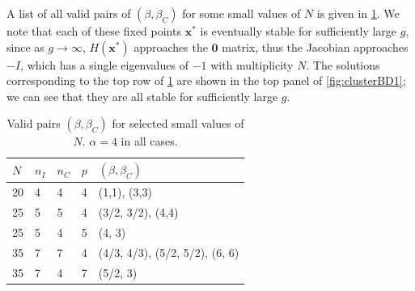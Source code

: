 \documentclass[11pt,reqno]{amsart}
\newcommand{\xvec}{\mathbf{x}}
\newcommand{\Zerovec}{\mathbf{0}}
\begin{document}
A list of all valid pairs of $(\beta, \beta_C)$ for some small values of $N$ is given in \cref{table:validbeta}. We note that each of these fixed points $\xvec^*$ is eventually stable for sufficiently large $g$, since as $g\rightarrow \infty$, $H(\xvec^*)$ approaches the $\Zerovec$ matrix, thus the Jacobian approaches $-I$, which has a single eigenvalues of $-1$ with multiplicity $N$. The solutions corresponding to the top row of \cref{table:validbeta} are shown in the top panel of \cref{fig:clusterBD1}; we can see that they are all stable for sufficiently large $g$.

\begin{table}
    \begin{tabular}{lllll}
        \toprule
        $N$ & $n_I$ & $n_C$ & $p$ & $(\beta, \beta_C)$ \\
        \midrule
        20 & 4 & 4 & 4 & (1,1), (3,3) \\
        25 & 5 & 5 & 4 & (3/2, 3/2), (4,4) \\
        25 & 5 & 4 & 5 & (4, 3) \\
        35 & 7 & 7 & 4 & (4/3, 4/3), (5/2, 5/2), (6, 6) \\
        35 & 7 & 4 & 7 & (5/2, 3) \\
        \bottomrule
    \end{tabular}
    \caption{Valid pairs $(\beta, \beta_C)$ for selected small values of $N$. $\alpha = 4$ in all cases.}
    \label{table:validbeta}
\end{table}


\end{document}
